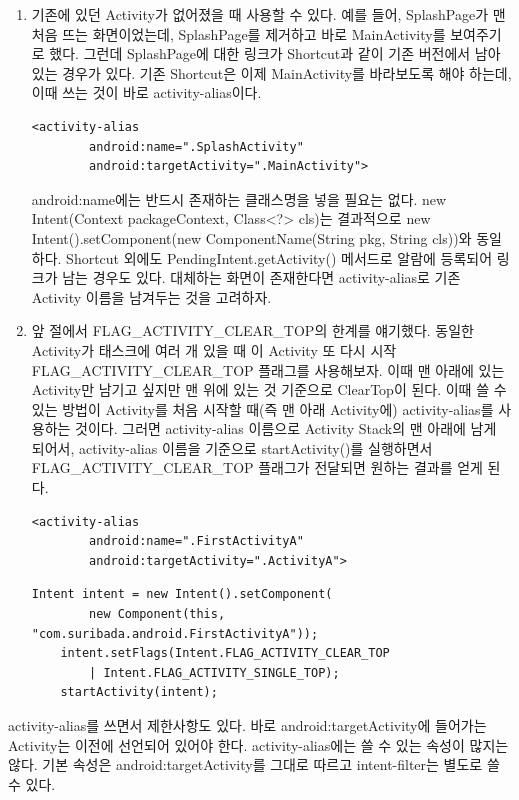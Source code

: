 \begin{enumerate}
\item 기존에 있던 Activity가 없어졌을 때 사용할 수 있다.
예를 들어, SplashPage가 맨 처음 뜨는 화면이었는데, SplashPage를 제거하고 바로 MainActivity를 보여주기로 했다.
그런데 SplashPage에 대한 링크가 Shortcut과 같이 기존 버전에서 남아있는 경우가 있다.
기존 Shortcut은 이제 MainActivity를 바라보도록 해야 하는데, 이때 쓰는 것이 바로 activity-alias이다.
\begin{lstlisting}[frame=single]
	<activity-alias
    	android:name=".SplashActivity"
        android:targetActivity=".MainActivity">
\end{lstlisting}
android:name에는 반드시 존재하는 클래스명을 넣을 필요는 없다. new Intent(Context packageContext, Class<?> cls)는 결과적으로 new Intent().setComponent(new ComponentName(String pkg, String cls))와 동일하다. 
Shortcut 외에도 PendingIntent.getActivity() 메서드로 알람에 등록되어 링크가 남는 경우도 있다. 대체하는 화면이 존재한다면 activity-alias로 기존 Activity 이름을 남겨두는 것을 고려하자.
\item 앞 절에서 FLAG\_ACTIVITY\_CLEAR\_TOP의 한계를 얘기했다. 동일한 Activity가 태스크에 여러 개 있을 때 이 Activity 또 다시 시작FLAG\_ACTIVITY\_CLEAR\_TOP 플래그를 사용해보자. 이때 맨 아래에 있는 Activity만 남기고 싶지만 맨 위에 있는 것 기준으로 ClearTop이 된다. 이때 쓸 수 있는 방법이 Activity를 처음 시작할 때(즉 맨 아래 Activity에) activity-alias를 사용하는 것이다. 그러면 activity-alias 이름으로  Activity Stack의 맨 아래에 남게 되어서, activity-alias 이름을 기준으로 startActivity()를 실행하면서 FLAG\_ACTIVITY\_CLEAR\_TOP 플래그가 전달되면 원하는 결과를 얻게 된다.
\begin{lstlisting}[frame=single]
	<activity-alias
    	android:name=".FirstActivityA"
        android:targetActivity=".ActivityA">
\end{lstlisting}
\begin{lstlisting}[frame=single]
	Intent intent = new Intent().setComponent(
		new Component(this, "com.suribada.android.FirstActivityA"));
	intent.setFlags(Intent.FLAG_ACTIVITY_CLEAR_TOP 
		| Intent.FLAG_ACTIVITY_SINGLE_TOP);
	startActivity(intent);
\end{lstlisting}
\end{enumerate} 

activity-alias를 쓰면서 제한사항도 있다.
바로 android:targetActivity에 들어가는 Activity는 이전에 선언되어 있어야 한다. 
activity-alias에는 쓸 수 있는 속성이 많지는 않다. 기본 속성은 android:targetActivity를 그대로 따르고 intent-filter는 별도로 쓸 수 있다.
